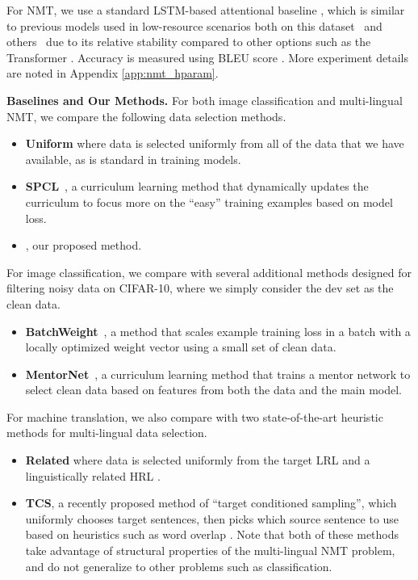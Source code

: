 For NMT, we use a standard LSTM-based attentional baseline \citep{attention}, which is similar to previous models used in low-resource scenarios both on this dataset~\citep{rapid_adapt_nmt,sde} and others~\citep{lownmt19} due to its relative stability compared to other options such as the Transformer \citep{vaswani2017attention}. Accuracy is measured using BLEU score \citep{bleu}.
More experiment details are noted in Appendix \ref{app:nmt_hparam}.

\noindent \textbf{Baselines and Our Methods.}
For both image classification and multi-lingual NMT, we compare the following data selection methods.
\begin{itemize}
\item \textbf{Uniform} where data is selected uniformly from all of the data that we have available, as is standard in training models. 
\item \textbf{SPCL}~\citep{spcl}, a curriculum learning method that dynamically updates the curriculum to focus more on the ``easy'' training examples based on model loss.
\item \textbf{\dds}, our proposed method.
\end{itemize}

For image classification, we compare with several additional methods designed for filtering noisy data on CIFAR-10, where we simply consider the dev set as the clean data.
\begin{itemize}
\item \textbf{BatchWeight}~\citep{learn_reweight}, a method that scales example training loss in a batch with a locally optimized weight vector using a small set of clean data. 
\item  \textbf{MentorNet}~\citep{mentornet}, a curriculum learning method that trains a mentor network to select clean data based on features from both the data and the main model. 
\end{itemize}


For machine translation, we also compare with two state-of-the-art heuristic methods for multi-lingual data selection.
\begin{itemize}
\item \textbf{Related} where data is selected uniformly from the target LRL and a linguistically related HRL \citep{rapid_adapt_nmt}. 
\item  \textbf{TCS}, a recently proposed method of ``target conditioned sampling'', which uniformly chooses target sentences, then picks which source sentence to use based on heuristics such as word overlap \citep{TCS}.
Note that both of these methods take advantage of structural properties of the multi-lingual NMT problem, and do not generalize to other problems such as classification.
\end{itemize}

